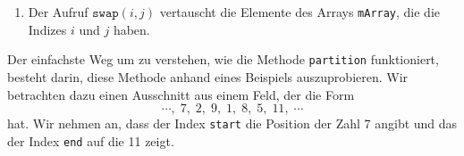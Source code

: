 \begin{enumerate}
      Index \texttt{end} von rechts nach links, bis ein Element gefunden wird, dass kleiner
      oder gleich dem Pivot-Element ist. Falls nun \texttt{leftIdx} kleiner als
      \texttt{rightIdx} ist, werden die entsprechenden Elemente des Feldes ausgetauscht.  In
      dem Moment, wo \texttt{leftIdx} gr\"o\3er oder gleich \texttt{rightIdx} wird, wird dieser
      Prozess abgebrochen. Jetzt wird noch das Pivot-Element in die Mitte gestellt,
      anschlie\3end wird \texttt{rightIdx} zur\"uck gegeben.
\item Der Aufruf $\texttt{swap}(i, j)$ vertauscht die Elemente des Arrays \texttt{mArray},
      die die Indizes $i$ und $j$ haben.  
\end{enumerate}
Der einfachste Weg um zu verstehen, wie die Methode \texttt{partition} funktioniert,
besteht darin, diese Methode anhand eines Beispiels auszuprobieren.  Wir betrachten dazu 
einen Ausschnitt aus einem Feld, der die Form 
\[ \cdots,\; 7,\; 2,\; 9,\; 1,\; 8,\; 5,\; 11,\;\cdots \]
hat.  Wir nehmen an, dass der Index \texttt{start} die Position der Zahl 7 angibt und das
der Index \texttt{end} auf die 11 zeigt.  

